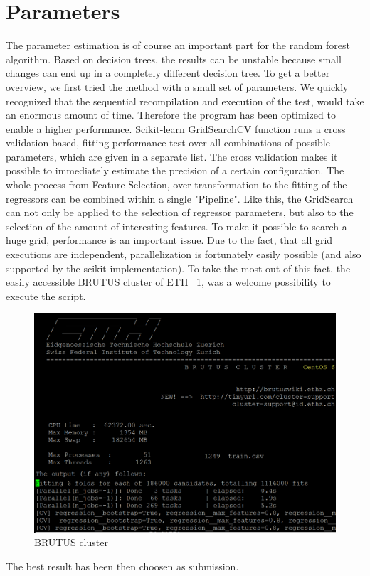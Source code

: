 \documentclass[a4paper, 10pt]{article}
\begin{document}
\section{Parameters}
The parameter estimation is of course an important part for the random forest algorithm. Based on decision trees, the results can be unstable because small changes can end up in a completely different decision tree. To get a better overview, we first tried the method with a small set of parameters. We quickly recognized that the sequential recompilation and execution of the test, would take an enormous amount of time. Therefore the program has been optimized to enable a higher performance.
Scikit-learn GridSearchCV function runs a cross validation based, fitting-performance test over all combinations of possible parameters, which are given in a separate list. The cross validation makes it possible to immediately estimate the precision of a certain configuration. The whole process from Feature Selection, over transformation to the fitting of the regressors can be combined within a single "Pipeline". Like this, the GridSearch can not only be applied to the selection of regressor parameters, but also to the selection of the amount of interesting features.
To make it possible to search a huge grid, performance is an important issue. Due to the fact, that all grid executions are independent, parallelization is fortunately easily possible (and also supported by the scikit implementation). To take the most out of this fact, the easily accessible BRUTUS cluster of ETH ~\ref{fig:brutus}, was a welcome possibility to execute the script.
\begin{figure}	
	\centering
	\includegraphics[scale=0.6]{ScreenshotCluster.png}
	\caption{BRUTUS cluster}
	\label{fig:brutus}
\end{figure}
The best result has been then choosen as submission.
\end{document}
